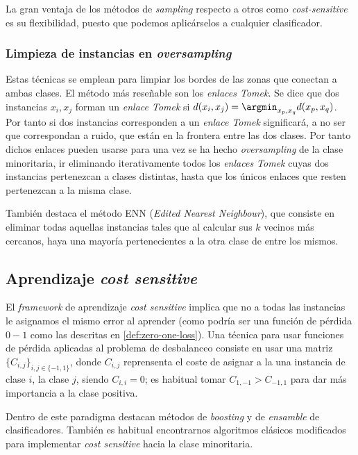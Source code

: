 La gran ventaja de los métodos de \textit{sampling} respecto a otros como \textit{cost-sensitive} es su flexibilidad, puesto
que podemos aplicárselos a cualquier clasificador.

\subsubsection{Limpieza de instancias en \textit{oversampling}}

Estas técnicas se emplean para limpiar los bordes de las zonas que conectan a ambas clases. El método más reseñable son los
\textit{enlaces Tomek}. Se dice que dos instancias $x_i, x_j$ forman un \textit{enlace Tomek} si 
$d(x_i, x_j) = \argmin_{x_p, x_q} d(x_p, x_q)$. Por tanto si dos instancias corresponden a un \textit{enlace Tomek} significará,
a no ser que correspondan a ruido, que están en la frontera entre las dos clases. Por tanto dichos enlaces pueden usarse para
una vez se ha hecho \textit{oversampling} de la clase minoritaria, ir eliminando iterativamente todos los \textit{enlaces Tomek}
cuyas dos instancias pertenezcan a clases distintas, hasta que los únicos enlaces que resten pertenezcan a la misma clase.

También destaca el método ENN (\textit{Edited Nearest Neighbour}), que consiste en eliminar todas aquellas instancias tales
que al calcular sus $k$ vecinos más cercanos, haya una mayoría pertenecientes a la otra clase de entre los mismos.

\subsection{Aprendizaje \textit{cost sensitive}}

El \textit{framework} de aprendizaje \textit{cost sensitive} implica que no a todas las instancias le asignamos el mismo error
al aprender (como podría ser una función de pérdida $0-1$ como las descritas en \ref{def:zero-one-loss}). Una técnica para usar
funciones de pérdida aplicadas al problema de desbalanceo consiste en usar una matriz $\{C_{i,j}\}_{i,j\in \{-1,1\}}$, 
donde $C_{i,j}$ reprensenta el coste de asignar a la una instancia de clase $i$, la clase $j$, siendo $C_{i,i} = 0$; es habitual
tomar $C_{1,-1} > C_{-1,1}$ para dar más importancia a la clase positiva.

Dentro de este paradigma destacan métodos de \textit{boosting} y de \textit{ensamble} de clasificadores. También es habitual
encontrarnos algoritmos clásicos modificados para implementar \textit{cost sensitive} hacia la clase minoritaria.

